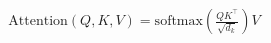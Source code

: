 \documentclass[preview]{standalone}
\begin{document}
\begin{align*}
\text{Attention}(Q, K, V) = \text{softmax}\left(\frac{QK^\top}{\sqrt{d_k}}\right) V
\end{align*}
\end{document}
